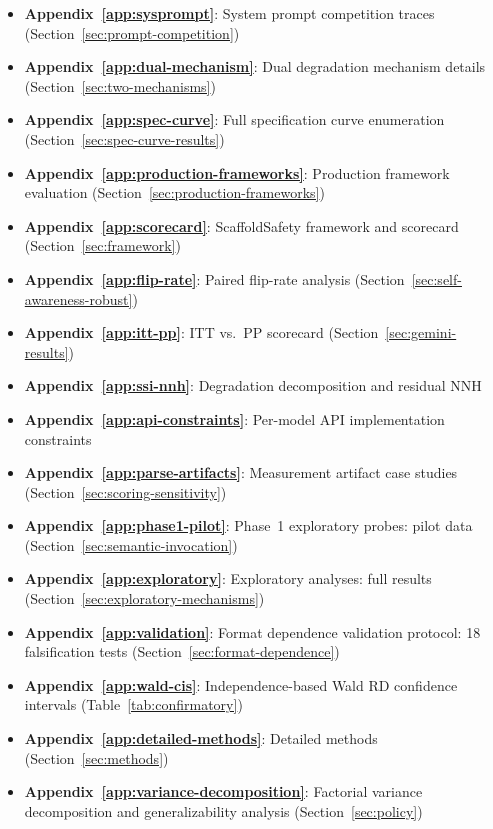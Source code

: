 \documentclass[preprint]{article}
\begin{document}
\begin{itemize}[leftmargin=*,nosep]
  \item \textbf{Appendix~\ref{app:sysprompt}}: System prompt competition traces (Section~\ref{sec:prompt-competition})
  \item \textbf{Appendix~\ref{app:dual-mechanism}}: Dual degradation mechanism details (Section~\ref{sec:two-mechanisms})
  \item \textbf{Appendix~\ref{app:spec-curve}}: Full specification curve enumeration (Section~\ref{sec:spec-curve-results})
  \item \textbf{Appendix~\ref{app:production-frameworks}}: Production framework evaluation (Section~\ref{sec:production-frameworks})
  \item \textbf{Appendix~\ref{app:scorecard}}: ScaffoldSafety framework and scorecard (Section~\ref{sec:framework})
  \item \textbf{Appendix~\ref{app:flip-rate}}: Paired flip-rate analysis (Section~\ref{sec:self-awareness-robust})
  \item \textbf{Appendix~\ref{app:itt-pp}}: ITT vs.\ PP scorecard (Section~\ref{sec:gemini-results})
  \item \textbf{Appendix~\ref{app:ssi-nnh}}: Degradation decomposition and residual NNH
  \item \textbf{Appendix~\ref{app:api-constraints}}: Per-model API implementation constraints
  \item \textbf{Appendix~\ref{app:parse-artifacts}}: Measurement artifact case studies (Section~\ref{sec:scoring-sensitivity})
  \item \textbf{Appendix~\ref{app:phase1-pilot}}: Phase~1 exploratory probes: pilot data (Section~\ref{sec:semantic-invocation})
  \item \textbf{Appendix~\ref{app:exploratory}}: Exploratory analyses: full results (Section~\ref{sec:exploratory-mechanisms})
  \item \textbf{Appendix~\ref{app:validation}}: Format dependence validation protocol: 18 falsification tests (Section~\ref{sec:format-dependence})
  \item \textbf{Appendix~\ref{app:wald-cis}}: Independence-based Wald RD confidence intervals (Table~\ref{tab:confirmatory})
  \item \textbf{Appendix~\ref{app:detailed-methods}}: Detailed methods (Section~\ref{sec:methods})
  \item \textbf{Appendix~\ref{app:variance-decomposition}}: Factorial variance decomposition and generalizability analysis (Section~\ref{sec:policy})
\end{itemize}
\end{document}
